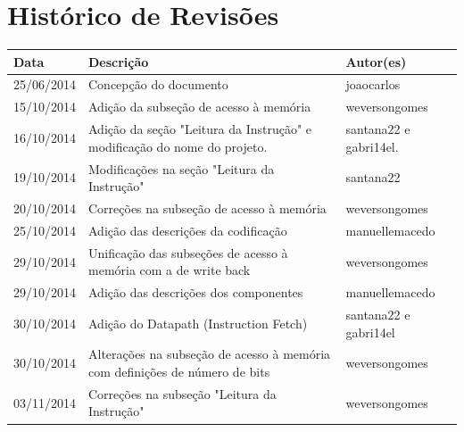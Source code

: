 \documentclass{report}
\begin{document}
\capa
%

\section*{\center Histórico de Revisões}
	\vspace*{1cm}
		\begin{longtable}[pos]{|m{2cm} | m{7.2cm} | m{3.8cm}|} \hline \cellcolor[gray]{0.9}

\textbf{Data} & \cellcolor[gray]{0.9}\textbf{Descrição} & \cellcolor[gray]{0.9} \textbf{Autor(es)}\\ \hline
      \small 25/06/2014 & \small Concepção do documento & \small joaocarlos \\ \hline
      \small 15/10/2014 & \small Adição da subseção de acesso à memória & \small weversongomes \\ \hline
      \small 16/10/2014 & \small Adição da seção "Leitura da Instrução" e modificação do nome do projeto. & \small santana22 e gabri14el.\\ \hline
      \small 19/10/2014 & \small Modificações na seção "Leitura da Instrução" & \small santana22 \\ \hline
      \small 20/10/2014 & \small Correções na subseção de acesso à memória & \small weversongomes \\ \hline
      \small 25/10/2014 & \small Adição das descrições da codificação & \small manuellemacedo \\ \hline
      \small 29/10/2014 & \small Unificação das subseções de acesso à memória com a de write back & \small weversongomes \\ \hline
      \small 29/10/2014 & \small Adição das descrições dos componentes & \small manuellemacedo \\ \hline
      \small 30/10/2014 & \small Adição do Datapath (Instruction Fetch) & \small santana22 e gabri14el \\ \hline
      \small 30/10/2014 & \small Alterações na subseção de acesso à memória com definições de número de bits & \small weversongomes \\ \hline
      \small 03/11/2014 & \small Correções na subseção "Leitura da Instrução" & \small weversongomes \\ \hline

\end{longtable}
\end{document}
